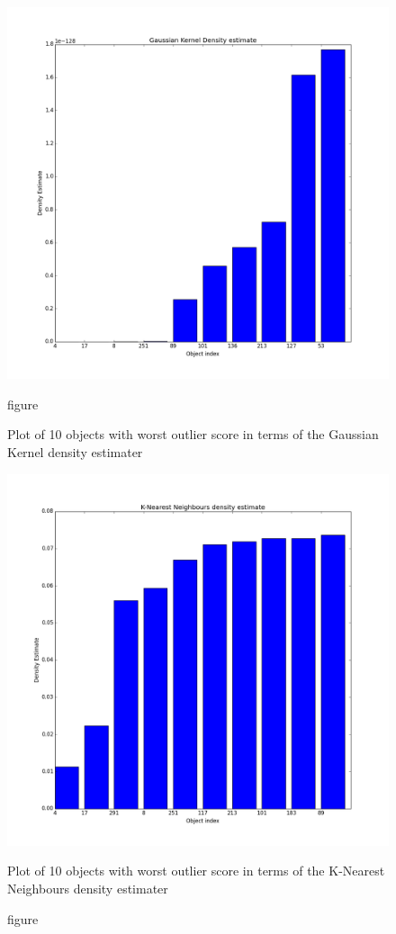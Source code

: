 \documentclass[a4paper]{article}
\begin{document}
\begin{figure}[H]
\centering
\begin{minipage}{.45\textwidth}
  \centering
  \includegraphics[width=1\linewidth]{fig_anomaly_kde_gauss}
  \caption{figure}{Plot of 10 objects with worst outlier score in terms of the Gaussian Kernel density estimater}
  \label{fig_anom_gauss}
\end{minipage}\hfill
\begin{minipage}{.45\textwidth}
  \centering
  \includegraphics[width=1\linewidth]{fig_anomaly_knn_de}
  \caption{figure}{Plot of 10 objects with worst outlier score in terms of the K-Nearest Neighbours density estimater}
  \label{fig_anom_knn}
\end{minipage}
\end{figure}
\end{document}
